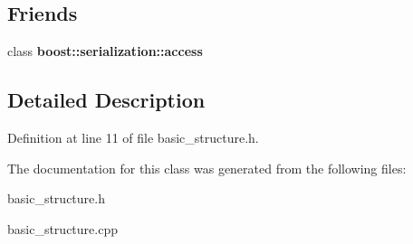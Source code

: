 \subsection*{Friends}
\begin{DoxyCompactItemize}
\item 
\hypertarget{class_lockable_ac98d07dd8f7b70e16ccb9a01abf56b9c}{}\label{class_lockable_ac98d07dd8f7b70e16ccb9a01abf56b9c} 
class {\bfseries boost\+::serialization\+::access}
\end{DoxyCompactItemize}


\subsection{Detailed Description}


Definition at line 11 of file basic\+\_\+structure.\+h.



The documentation for this class was generated from the following files\+:\begin{DoxyCompactItemize}
\item 
basic\+\_\+structure.\+h\item 
basic\+\_\+structure.\+cpp\end{DoxyCompactItemize}
